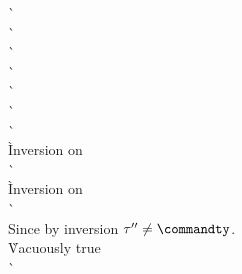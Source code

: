 \begin{description}
\begin{tabbing}
      \`  \\
      \`  \\
      \`  \\
      \`  \\
      \`  \\

      \`  \\
      \`  \\
      \` Inversion on  \\
      \`  \\
      \` Inversion on  \\
      \`  \\
    Since  by inversion $\tau'' \not= \commandty$. \\
      \` Vacuously true \\
      \`  \- \\
  \end{tabbing}


\end{description}
